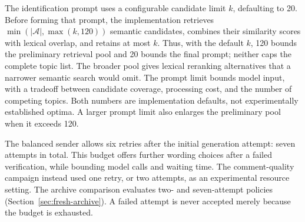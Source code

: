 The identification prompt uses a configurable candidate limit $k$, defaulting to 20. Before forming that prompt, the implementation retrieves $\min(|\mathcal{A}|,\max(k,120))$ semantic candidates, combines their similarity scores with lexical overlap, and retains at most $k$. Thus, with the default $k$, 120 bounds the preliminary retrieval pool and 20 bounds the final prompt; neither caps the complete topic list. The broader pool gives lexical reranking alternatives that a narrower semantic search would omit. The prompt limit bounds model input, with a tradeoff between candidate coverage, processing cost, and the number of competing topics. Both numbers are implementation defaults, not experimentally established optima. A larger prompt limit also enlarges the preliminary pool when it exceeds 120.

The balanced sender allows six retries after the initial generation attempt: seven attempts in total. This budget offers further wording choices after a failed verification, while bounding model calls and waiting time. The comment-quality campaign instead used one retry, or two attempts, as an experimental resource setting. The archive comparison evaluates two- and seven-attempt policies (Section~\ref{sec:fresh-archive}). A failed attempt is never accepted merely because the budget is exhausted.




